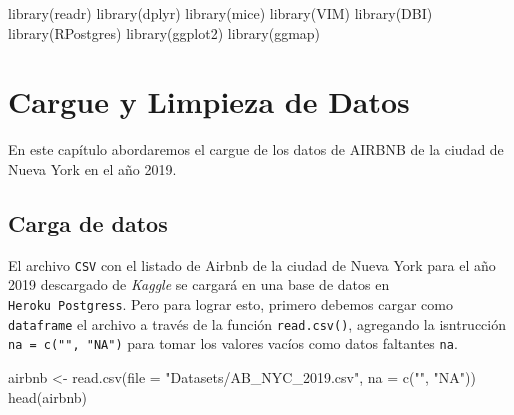 \documentclass[
]{book}
\newenvironment{Shaded}{\begin{snugshade}}{\end{snugshade}}
\newcommand{\AttributeTok}[1]{\textcolor[rgb]{0.77,0.63,0.00}{#1}}
\newcommand{\FunctionTok}[1]{\textcolor[rgb]{0.00,0.00,0.00}{#1}}
\newcommand{\NormalTok}[1]{#1}
\newcommand{\OtherTok}[1]{\textcolor[rgb]{0.56,0.35,0.01}{#1}}
\newcommand{\StringTok}[1]{\textcolor[rgb]{0.31,0.60,0.02}{#1}}
\begin{document}
\begin{Shaded}
\begin{Highlighting}[]
\FunctionTok{library}\NormalTok{(readr)}
\FunctionTok{library}\NormalTok{(dplyr)}
\FunctionTok{library}\NormalTok{(mice)}
\FunctionTok{library}\NormalTok{(VIM)}
\FunctionTok{library}\NormalTok{(DBI)}
\FunctionTok{library}\NormalTok{(RPostgres)}
\FunctionTok{library}\NormalTok{(ggplot2)}
\FunctionTok{library}\NormalTok{(ggmap)}
\end{Highlighting}
\end{Shaded}

\hypertarget{cargue-y-limpieza-de-datos}{%
\chapter{Cargue y Limpieza de Datos}\label{cargue-y-limpieza-de-datos}}

En este capítulo abordaremos el cargue de los datos de AIRBNB de la ciudad de Nueva York en el año 2019.

\hypertarget{carga-de-datos}{%
\section{Carga de datos}\label{carga-de-datos}}

El archivo \texttt{CSV} con el listado de Airbnb de la ciudad de Nueva York para el año 2019 descargado de \emph{Kaggle} se cargará en una base de datos en \texttt{Heroku\ Postgress}. Pero para lograr esto, primero debemos cargar como \texttt{dataframe} el archivo a través de la función \texttt{read.csv()}, agregando la isntrucción \texttt{na\ =\ c("",\ "NA")} para tomar los valores vacíos como datos faltantes \texttt{na}.

\begin{Shaded}
\begin{Highlighting}[]
\NormalTok{airbnb }\OtherTok{\textless{}{-}} \FunctionTok{read.csv}\NormalTok{(}\AttributeTok{file =} \StringTok{"Datasets/AB\_NYC\_2019.csv"}\NormalTok{, }\AttributeTok{na =} \FunctionTok{c}\NormalTok{(}\StringTok{""}\NormalTok{, }\StringTok{"NA"}\NormalTok{))}
\FunctionTok{head}\NormalTok{(airbnb)}
\end{Highlighting}
\end{Shaded}
\end{document}
